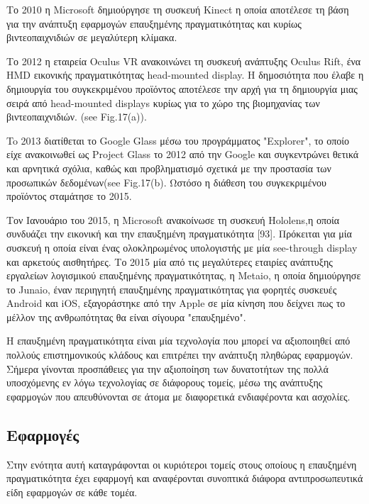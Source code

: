 Το 2010 η Microsoft δημιούργησε τη συσκευή Kinect η οποία αποτέλεσε τη βάση για την ανάπτυξη εφαρμογών επαυξημένης πραγματικότητας και κυρίως βιντεοπαιχνιδιών σε μεγαλύτερη κλίμακα.

Το 2012 η εταιρεία Oculus VR ανακοινώνει τη συσκευή ανάπτυξης Oculus Rift, ένα HMD εικονικής πραγματικότητας head-mounted display. Η δημοσιότητα που έλαβε η δημιουργία του συγκεκριμένου προϊόντος αποτέλεσε την αρχή για τη δημιουργία μιας σειρά από head-mounted displays κυρίως για το χώρο της βιομηχανίας των βιντεοπαιχνιδιών. (see Fig.17(a)).


To 2013 διατίθεται το Google Glass μέσω του προγράμματος "Explorer", το οποίο είχε ανακοινωθεί ως Project Glass το 2012 από την Google και συγκεντρώνει θετικά και αρνητικά σχόλια, καθώς και προβληματισμό σχετικά με την προστασία των προσωπικών δεδομένων(see Fig.17(b). Ωστόσο η διάθεση του συγκεκριμένου προϊόντος σταμάτησε το 2015.

Τον Ιανουάριο του 2015, η Microsoft ανακοίνωσε τη συσκευή Hololens,η οποία συνδυάζει την εικονική και την επαυξημένη πραγματικότητα [93]. Πρόκειται για μία συσκευή η οποία είναι ένας ολοκληρωμένος υπολογιστής με μία see-through display και αρκετούς αισθητήρες.\cite{hololens}
Το 2015 μία από τις μεγαλύτερες εταιρίες ανάπτυξης εργαλείων λογισμικού επαυξημένης πραγματικότητας, η Metaio, η οποία δημιούργησε το Junaio, έναν περιηγητή επαυξημένης πραγματικότητας για φορητές συσκευές Android και iOS, εξαγοράστηκε από την Apple σε μία κίνηση\cite{applemetaio} που δείχνει πως το μέλλον της ανθρωπότητας θα είναι σίγουρα "επαυξημένο". 


Η επαυξημένη πραγματικότητα είναι μία τεχνολογία που μπορεί να αξιοποιηθεί από πολλούς επιστημονικούς κλάδους και επιτρέπει την ανάπτυξη πληθώρας εφαρμογών. Σήμερα γίνονται προσπάθειες για την αξιοποίηση των δυνατοτήτων της πολλά υποσχόμενης εν λόγω τεχνολογίας σε διάφορους τομείς, μέσω της ανάπτυξης εφαρμογών που απευθύνονται σε άτομα με διαφορετικά ενδιαφέροντα και ασχολίες.




\subsection{Εφαρμογές} \label{sec:apps}

Στην ενότητα αυτή καταγράφονται οι κυριότεροι τομείς στους οποίους η επαυξημένη πραγματικότητα έχει εφαρμογή και αναφέρονται συνοπτικά διάφορα αντιπροσωπευτικά είδη εφαρμογών σε κάθε τομέα. 

